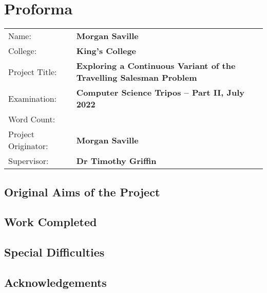 \pagestyle{plain}

\chapter*{Proforma}

{\large
  \begin{tabular}{l p{12cm}}
    Name:               & \bf Morgan Saville                                                    \\
    College:            & \bf King's College                                                    \\
    Project Title:      & \bf Exploring a Continuous Variant of the Travelling Salesman Problem \\
    Examination:        & \bf Computer Science Tripos -- Part II, July 2022                     \\
    Word Count:         & \bf                                      \\
    Project Originator: & \bf Morgan Saville                                                    \\
    Supervisor:         & \bf Dr Timothy Griffin                                                \\
  \end{tabular}
}

\section*{Original Aims of the Project}

\todo

\section*{Work Completed}

\todo

\section*{Special Difficulties}

\todo

\newpage
\section*{Acknowledgements}

\todo